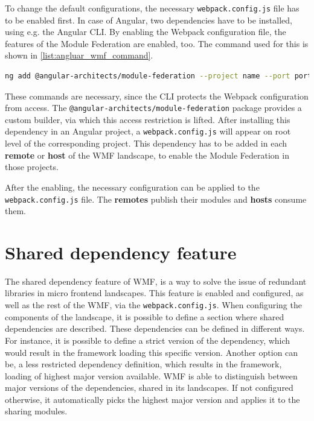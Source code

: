 To change the default configurations, the necessary \texttt{webpack.config.js} file has to be enabled first.
In case of Angular, two dependencies have to be installed, using e.g. the Angular CLI. By enabling the Webpack configuration file, the features of the Module Federation are enabled, too. The command used for this is shown in \ref{list:angluar_wmf_command}. 

\begin{lstlisting}[language=Bash, caption=Angular CLI console command to enable Module Federation in an Angular project, label=list:angluar_wmf_command,  xleftmargin=.0\textwidth, xrightmargin=.0\textwidth]
	ng add @angular-architects/module-federation --project name --port port
\end{lstlisting}

These commands are necessary, since the CLI protects the Webpack configuration from access. The \texttt{@angular-architects/module-federation} package provides a custom builder, via which this access restriction is lifted.
After installing this dependency in an Angular project, a \texttt{webpack.config.js} will appear on root level of the corresponding project.\cite{wmf_angular_dependency_install}
This dependency has to be added in each \textbf{remote} or \textbf{host} of the WMF landscape, to enable the Module Federation in those projects.

After the enabling, the necessary configuration can be applied to the \texttt{webpack.config.js} file. The \textbf{remotes} publish their modules and \textbf{hosts} consume them. 

\section{Shared dependency feature}

The shared dependency feature of WMF, is a way to solve the issue of redundant libraries in micro frontend landscapes.
This feature is enabled and configured, as well as the rest of the WMF, via the \texttt{webpack.config.js}. When configuring the components of the landscape, it is possible to define a section where shared dependencies are described. These dependencies can be defined in different ways. For instance, it is possible to define a strict version of the dependency, which would result in the framework loading this specific version. Another option can be, a less restricted dependency definition, which results in the framework, loading of highest major version available. WMF is able to distinguish between major versions of the dependencies, shared in its landscapes. If not configured otherwise, it automatically picks the highest major version and applies it to the sharing modules. 

